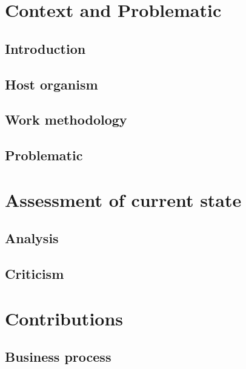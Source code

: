 \documentclass[oneside]{book}
\begin{document}
    \chapter{Context and Problematic}\label{sec:context}

    \section{Introduction}
    

    \section{Host organism}\label{sec:host-organization}
    

    \section{Work methodology}\label{sec:work-methodology}
    

    \section{Problematic}\label{sec:problematic}
    

    \chapter{Assessment of current state}\label{sec:assessment-of-current-state}
    \section{Analysis}\label{sec:analysis}
    

    \section{Criticism}\label{sec:criticism}
    

    \chapter{Contributions}
    \section{Business process}\label{sec:business-process}
    
\end{document}
